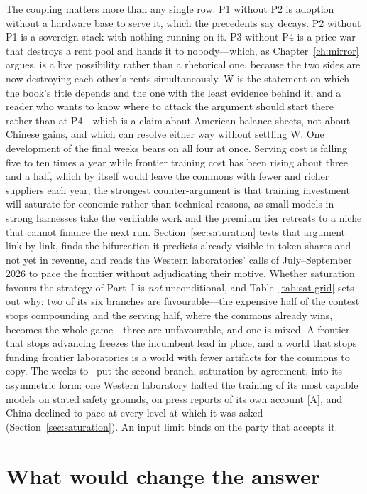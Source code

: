 The coupling matters more than any single row. P1 without P2 is adoption without a hardware base to serve it, which the precedents say decays. P2 without P1 is a sovereign stack with nothing running on it. P3 without P4 is a price war that destroys a rent pool and hands it to nobody---which, as Chapter~\ref{ch:mirror} argues, is a live possibility rather than a rhetorical one, because the two sides are now destroying each other's rents simultaneously. W is the statement on which the book's title depends and the one with the least evidence behind it, and a reader who wants to know where to attack the argument should start there rather than at P4---which is a claim about American balance sheets, not about Chinese gains, and which can resolve either way without settling W. One development of the final weeks bears on all four at once. Serving cost is falling five to ten times a year while frontier training cost has been rising about three and a half, which by itself would leave the commons with fewer and richer suppliers each year; the strongest counter-argument is that training investment will saturate for economic rather than technical reasons, as small models in strong harnesses take the verifiable work and the premium tier retreats to a niche that cannot finance the next run. Section~\ref{sec:saturation} tests that argument link by link, finds the bifurcation it predicts already visible in token shares and not yet in revenue, and reads the Western laboratories' calls of July--September 2026 to pace the frontier without adjudicating their motive. Whether saturation favours the strategy of Part~I is \emph{not} unconditional, and Table~\ref{tab:sat-grid} sets out why: two of its six branches are favourable---the expensive half of the contest stops compounding and the serving half, where the commons already wins, becomes the whole game---three are unfavourable, and one is mixed. A frontier that stops advancing freezes the incumbent lead in place, and a world that stops funding frontier laboratories is a world with fewer artifacts for the commons to copy. The weeks to \datafreeze\ put the second branch, saturation by agreement, into its asymmetric form: one Western laboratory halted the training of its most capable models on stated safety grounds, on press reports of its own account [A], and China declined to pace at every level at which it was asked (Section~\ref{sec:saturation}). An input limit binds on the party that accepts it.

\section{What would change the answer}
\label{sec:summary-falsifiers}


